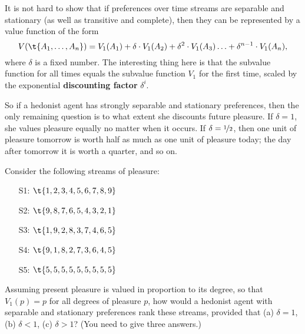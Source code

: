 It is not hard to show that if preferences over time streams are
separable and stationary (as well as transitive and complete), then
they can be represented by a value function of the form
\[
V(\t{A_1,\ldots,A_n}) = V_1(A_1) + \delta \cdot V_1(A_2) +
\delta^2 \cdot V_1(A_3) \ldots + \delta^{n-1} \cdot V_1(A_n),
\]
where $\delta$ is a fixed number. The interesting thing here is that the
subvalue function for all times equals the subvalue function $V_1$ for the first
time, scaled by the exponential \textbf{discounting factor} $\delta^i$.


So if a hedonist agent has strongly separable and stationary preferences, then
the only remaining question is to what extent she discounts future pleasure. If
$\delta = 1$, she values pleasure equally no matter when it occurs. If
$\delta = \nicefrac{1}{2}$, then one unit of pleasure tomorrow is worth half as
much as one unit of pleasure today; the day after tomorrow it is worth a
quarter, and so on.

\begin{exercise}{1}
  Consider the following streams of pleasure:
  \begin{enumerate}
    \itemsep-0.3em 
  \item[S1:] $\t{1,2,3,4,5,6,7,8,9}$ 
  \item[S2:] $\t{9,8,7,6,5,4,3,2,1}$
  \item[S3:] $\t{1,9,2,8,3,7,4,6,5}$ 
  \item[S4:] $\t{9,1,8,2,7,3,6,4,5}$ 
  \item[S5:] $\t{5,5,5,5,5,5,5,5,5}$
  \end{enumerate}
  Assuming present pleasure is valued in proportion to its degree, so
  that $V_1(p) = p$ for all degrees of pleasure $p$, how would a
  hedonist agent with separable and stationary preferences rank these
  streams, provided that (a) $\delta = 1$, (b)
  $\delta < 1$, (c) $\delta > 1$? (You need to give three answers.)
\end{exercise}


